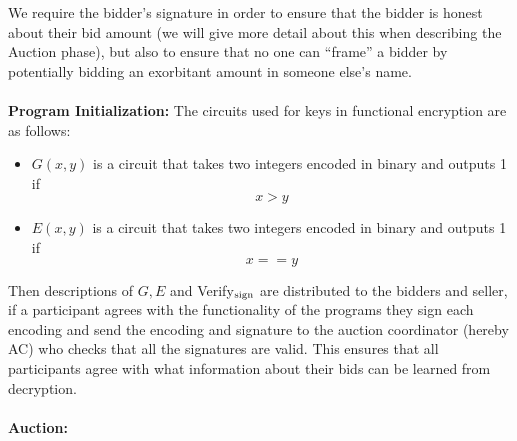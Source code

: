 \documentclass[12pt,twoside]{reedthesis}
\begin{document}
     \par We require the bidder's signature in order to ensure that the bidder is honest about their bid amount (we will give more detail about this when describing the Auction phase), but also to ensure that no one can ``frame'' a bidder by potentially bidding an exorbitant amount in someone else's name.
%
%
%
    \\ \\ \textbf{Program Initialization:} The circuits used for keys in functional encryption are as follows:
    \begin{itemize}
    \item $G(x,y)$ is a circuit that takes two integers encoded in binary and outputs  1 if $$x>y$$
    \item $E(x,y)$ is a circuit that takes two integers encoded in binary and outputs 1 if $$
    x==y$$
    \end{itemize}
    Then descriptions of $G,E$ and Verify$_\text{sign}$ are distributed to the bidders and seller, if a participant agrees with the functionality of the programs they sign each encoding and send the encoding and signature to the auction coordinator (hereby AC) who checks that all the signatures are valid. This ensures that all participants agree with what information about their bids can be learned from decryption. \\
    \\
       \textbf{Auction:} 
       
\end{document}
